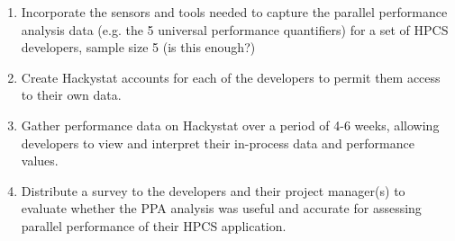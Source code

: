 \documentclass[11pt,twocolumn]{article}
\begin{document}
\begin{enumerate}
\item 
Incorporate the sensors and tools needed to capture the parallel
performance analysis data (e.g. the 5 universal performance
quantifiers) for a set of HPCS developers, sample size 5 (is this
enough?)

\item 
Create Hackystat accounts for each of the developers to permit them
access to their own data.

\item 
Gather performance data on Hackystat over a period of 4-6 weeks, allowing
developers to view and interpret their in-process data and performance values.

\item 
Distribute a survey to the developers and their project manager(s) to
evaluate whether the PPA analysis was useful and accurate for
assessing parallel performance of their HPCS application.
\end{enumerate}

%
% 
\end{document}
